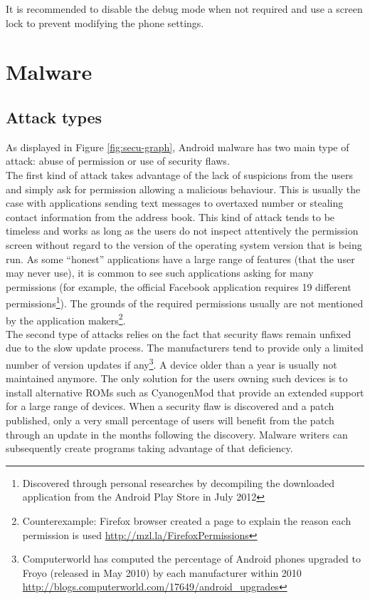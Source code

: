 It is recommended to disable the debug mode when not required and use a screen lock to prevent modifying the phone settings.

\section{Malware}
\label{sec:and-malware}

\subsection{Attack types}
\label{sec:malware-type}

As displayed in Figure \ref{fig:secu-graph}, Android malware has two main type of attack: abuse of permission or use of security flaws.\\

The first kind of attack takes advantage of the lack of suspicions from the users and simply ask for permission allowing a malicious behaviour.
This is usually the case with applications sending text messages to overtaxed number or stealing contact information from the address book.
This kind of attack tends to be timeless and works as long as the users do not inspect attentively the permission screen without regard to the version of the operating system version that is being run.
As some ``honest'' applications have a large range of features (that the user may never use), it is common to see such applications asking for many permissions (for example, the official Facebook application requires 19 different permissions\footnote{Discovered through personal researches by decompiling the downloaded application from the Android Play Store in July 2012}).
The grounds of the required permissions usually are not mentioned by the application makers\footnote{Counterexample: Firefox browser created a page to explain the reason each permission is used \url{http://mzl.la/FirefoxPermissions}}.\\

The second type of attacks relies on the fact that security flaws remain unfixed due to the slow update process.
The manufacturers tend to provide only a limited number of version updates if any\footnote{Computerworld has computed the percentage of Android phones upgraded to Froyo (released in May 2010) by each manufacturer within 2010 \url{http://blogs.computerworld.com/17649/android_upgrades}}.
A device older than a year is usually not maintained anymore.
The only solution for the users owning such devices is to install alternative ROMs such as CyanogenMod that provide an extended support for a large range of devices.
When a security flaw is discovered and a patch published, only a very small percentage of users will benefit from the patch through an update in the months following the discovery.
Malware writers can subsequently create programs taking advantage of that deficiency.\\

